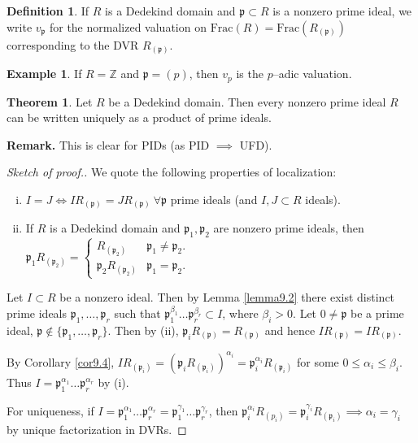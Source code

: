 \documentclass{article}
\theoremstyle{definition}
\newtheorem{theorem}{Theorem}[section]
\newtheorem{example}{Example}[section]
\newtheorem{defn}{Definition}[section]
\begin{document}

\begin{defn}
    If $R$ is a Dedekind domain and $\mathfrak{p} \subset R$ is a nonzero prime ideal, we write $v_{\mathfrak{p}}$ for the normalized valuation on $\text{Frac}(R) = \text{Frac}(R_{(\mathfrak{p})})$ corresponding to the DVR $R_{(\mathfrak{p})}$.
\end{defn}
\begin{example}
    If $R = \mathbb{Z}$ and $\mathfrak{p} = (p)$, then $v_p$ is the $p$--adic valuation.
\end{example}
\begin{theorem}
    Let $R$ be a Dedekind domain. Then every nonzero prime ideal $R$ can be written uniquely as a product of prime ideals.
\end{theorem}
\textbf{Remark.} This is clear for PIDs (as PID $\implies $ UFD).
\begin{proof}[Sketch of proof.]
    We quote the following properties of localization:
    \begin{enumerate}[(i)]
        \item $I=J \iff IR_{(\mathfrak{p})} = JR_{(\mathfrak{p})} ~\forall \mathfrak{p}$ prime ideals (and $I, J \subset R$ ideals).
        \item If $R$ is a Dedekind domain and $\mathfrak{p}_1, \mathfrak{p}_2$ are nonzero prime ideals, then $\mathfrak{p}_1 R_{(\mathfrak{p}_2)} = \begin{cases}
            R_{(\mathfrak{p}_2)} & \mathfrak{p}_1 \neq \mathfrak{p}_2.\\
            \mathfrak{p}_2 R_{(\mathfrak{p}_2)} & \mathfrak{p}_1 = \mathfrak{p}_2.
        \end{cases}$
    \end{enumerate}
    Let $I \subset R$ be a nonzero ideal. Then by Lemma \ref{lemma9.2} there exist distinct prime ideals $\mathfrak{p}_1,\ldots,\mathfrak{p}_r$ such that $\mathfrak{p}_1^{\beta_1}\ldots \mathfrak{p}_r^{\beta_r} \subset I$, where $\beta_i > 0$. Let $0 \neq \mathfrak{p}$ be a prime ideal, $\mathfrak{p} \not\in \{\mathfrak{p_1},\ldots,\mathfrak{p}_r\}$. Then by (ii), $\mathfrak{p}_i R_{(\mathfrak{p})} = R_{(\mathfrak{p})}$ and hence $IR_{(\mathfrak{p})} = IR_{(\mathfrak{p})}$.
    \vspace{1mm}
     
    By Corollary \ref{cor9.4}, $I R_{(\mathfrak{p}_i)} = (\mathfrak{p}_i R_{(\mathfrak{p}_i)})^{\alpha_i} = \mathfrak{p}_i^{\alpha_i}R_{(\mathfrak{p}_i)}$ for some $0\le \alpha_i \le \beta_i$. Thus $I = \mathfrak{p}_1^{\alpha_1} \ldots \mathfrak{p}_r^{\alpha_r}$ by (i).
    \vspace{1mm}
     
    For uniqueness, if $I = \mathfrak{p}_1^{\alpha_1}\ldots \mathfrak{p}_r^{\alpha_r} = \mathfrak{p}_1^{\gamma_1} \ldots \mathfrak{p}_r^{\gamma_r}$, then $\mathfrak{p}_i^{\alpha_i}R_{(p_i)} = \mathfrak{p}_i^{\gamma_i}R_{(\mathfrak{p}_i)} \implies \alpha_i = \gamma_i$ by unique factorization in DVRs.
\end{proof}
\end{document}
